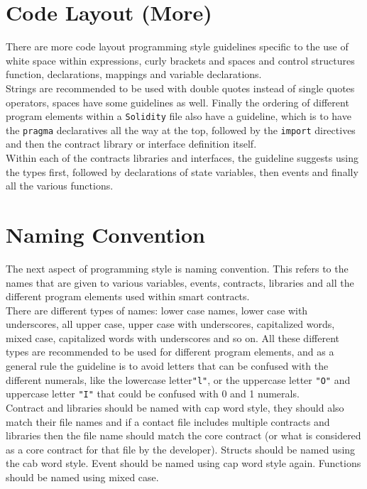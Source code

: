 \section{Code Layout (More)}
There are more code layout programming style guidelines specific to the use of white space within expressions, curly brackets and spaces and control structures function, declarations, mappings and variable declarations.\\

Strings are recommended to be used with double quotes instead of single quotes operators, spaces have some guidelines as well. Finally the ordering of different program elements within a \texttt{Solidity} file also have a guideline, which is to have the \texttt{pragma} declaratives all the way at the top, followed by the \texttt{import} directives and then the contract library or interface definition itself.\\

Within each of the contracts libraries and interfaces, the guideline suggests using the types first, followed by declarations of state variables, then events and finally all the various functions.

\section{Naming Convention}
The next aspect of programming style is naming convention. This refers to the names that are given to various variables, events, contracts, libraries and all the different program elements used within smart contracts.\\

There are different types of names: lower case names, lower case with underscores, all upper case, upper case with underscores, capitalized words, mixed case, capitalized words with underscores and so on. All these different types are recommended to be used for different program elements, and as a general rule the guideline is to avoid letters that can be confused with the different numerals, like the lowercase letter\texttt{"l"}, or the uppercase letter \texttt{"O"} and uppercase letter \texttt{"I"} that could be confused with 0 and 1 numerals.\\

Contract and libraries should be named with cap word style, they should also match their file names and if a contact file includes multiple contracts and libraries then the file name should match the core contract (or what is considered as a core contract for that file by the developer). Structs should be named using the cab word style. Event should be named using cap word style again. Functions should be named using mixed case.\\

